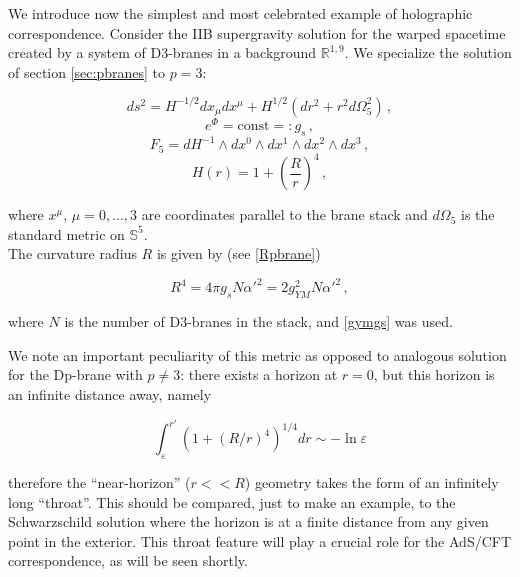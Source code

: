 We introduce now the simplest and most celebrated example of holographic correspondence. Consider the IIB supergravity solution for the warped spacetime created by a system of D3-branes in a background $\mathbb{R}^{1,9}$. We specialize the solution of section \ref{sec:pbranes} to $p=3$:

\begin{equation}
	ds^2 = H^{-1/2} dx_\mu dx^\mu + H^{1/2} (dr^2 + r^2 d\Omega^2_5)\label{black3metric}\,,
\end{equation}
\begin{equation}
	e^\Phi = \mathrm{const} =: g_s\,,
\end{equation}
\begin{equation}
	F_5 = dH^{-1} \wedge dx^0 \wedge dx^1 \wedge dx^2 \wedge dx^3\,,
\end{equation}
\begin{equation}
	H(r) = 1 + \left( \frac{R}{r} \right)^4\,,
	\label{}
\end{equation}

where $x^\mu$, $\mu = 0,\ldots,3$ are coordinates parallel to the brane stack and $d\Omega_5$ is the standard metric on $\mathbb{S}^5$.\\

The curvature radius $R$ is given by (see \eqref{Rpbrane})

\begin{equation}
	R^4 = 4\pi g_s N \alpha'^2 = 2 g_{YM}^2 N \alpha'^2\,,
	\label{}
\end{equation}

where $N$ is the number of D3-branes in the stack, and \eqref{gymgs} was used.

We note an important peculiarity of this metric as opposed to analogous solution for the Dp-brane with $p\neq 3$: there exists a horizon at $r=0$, but this horizon is an infinite distance away, namely

\begin{equation}
	\int_\varepsilon^{r'} \left( 1 + \left( R/r \right)^4 \right)^{1/4} dr \sim -\ln\varepsilon
	\label{}
\end{equation}

therefore the ``near-horizon'' ($r<<R$) geometry takes the form of an infinitely long ``throat''. This should be compared, just to make an example, to the Schwarzschild solution where the horizon is at a finite distance from any given point in the exterior. This throat feature will play a crucial role for the AdS/CFT correspondence, as will be seen shortly.

